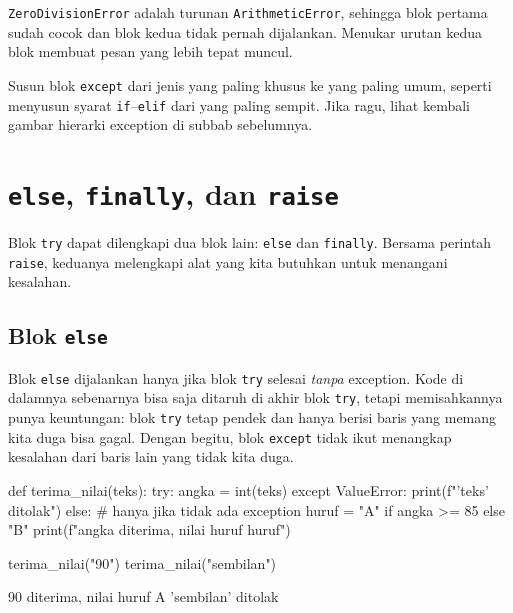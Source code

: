 \texttt{ZeroDivisionError} adalah turunan \texttt{ArithmeticError}, sehingga blok pertama sudah cocok dan blok kedua tidak pernah dijalankan. Menukar urutan kedua blok membuat pesan yang lebih tepat muncul.

\begin{tips}
Susun blok \texttt{except} dari jenis yang paling khusus ke yang paling umum, seperti menyusun syarat \texttt{if}--\texttt{elif} dari yang paling sempit. Jika ragu, lihat kembali gambar hierarki exception di subbab sebelumnya.
\end{tips}

\section{\texttt{else}, \texttt{finally}, dan \texttt{raise}}

Blok \texttt{try} dapat dilengkapi dua blok lain: \texttt{else} dan \texttt{finally}. Bersama perintah \texttt{raise}, keduanya melengkapi alat yang kita butuhkan untuk menangani kesalahan.

\subsection{Blok \texttt{else}}

Blok \texttt{else} dijalankan hanya jika blok \texttt{try} selesai \emph{tanpa} exception. Kode di dalamnya sebenarnya bisa saja ditaruh di akhir blok \texttt{try}, tetapi memisahkannya punya keuntungan: blok \texttt{try} tetap pendek dan hanya berisi baris yang memang kita duga bisa gagal. Dengan begitu, blok \texttt{except} tidak ikut menangkap kesalahan dari baris lain yang tidak kita duga.

\begin{kode}
def terima_nilai(teks):
    try:
        angka = int(teks)
    except ValueError:
        print(f"'{teks}' ditolak")
    else:                                    # hanya jika tidak ada exception
        huruf = "A" if angka >= 85 else "B"
        print(f"{angka} diterima, nilai huruf {huruf}")

terima_nilai("90")
terima_nilai("sembilan")
\end{kode}

\begin{keluaran}
90 diterima, nilai huruf A
'sembilan' ditolak
\end{keluaran}

